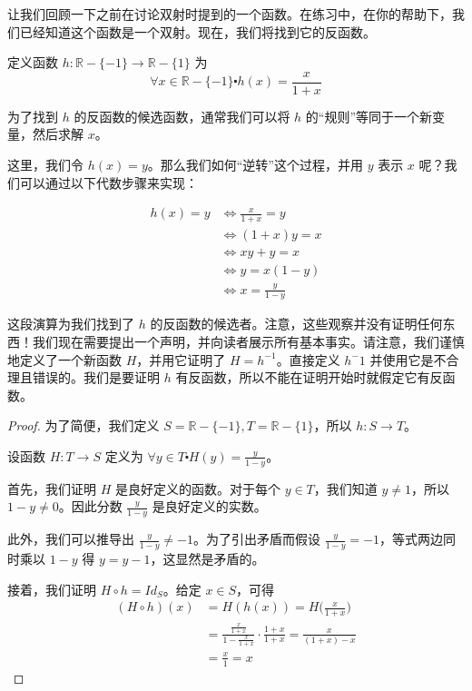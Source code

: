 让我们回顾一下之前在讨论双射时提到的一个函数。在练习中，在你的帮助下，我们已经知道这个函数是一个双射。现在，我们将找到它的反函数。\\

\begin{example}
    定义函数 $h : \mathbb{R} - \{-1\} \to \mathbb{R}- \{1\}$ 为
    \[\forall x \in \mathbb{R} - \{-1\} \centerdot h(x) = \frac{x}{1+x}\]

    为了找到 $h$ 的反函数的候选函数，通常我们可以将 $h$ 的``规则''等同于一个新变量，然后求解 $x$。

    这里，我们令 $h(x) = y$。那么我们如何``逆转''这个过程，并用 $y$ 表示 $x$ 呢？我们可以通过以下代数步骤来实现：

    \begin{align*}
        h(x) = y &\iff \frac{x}{1+x} = y \\
        &\iff (1 + x)y = x \\
        &\iff xy + y = x \\
        &\iff y = x(1 - y) \\
        &\iff x = \frac{y}{1-y}
    \end{align*}

    这段演算为我们找到了 $h$ 的反函数的候选者。注意，这些观察并没有证明任何东西！我们现在需要提出一个声明，并向读者展示所有基本事实。请注意，我们谨慎地定义了一个新函数 $H$，并用它证明了 $H = h^{-1}$。直接定义 $h^-1$ 并使用它是不合理且错误的。我们是要证明 $h$ 有反函数，所以不能在证明开始时就假定它有反函数。

    \begin{proof}
        为了简便，我们定义 $S = \mathbb{R} - \{-1\}, T = \mathbb{R}- \{1\}$，所以 $h:S \to T$。

        设函数 $H: T \to S$ 定义为 $\forall y \in T \centerdot H(y) = \frac{y}{1-y}$。

        首先，我们证明 $H$ 是良好定义的函数。对于每个 $y \in T$，我们知道 $y \ne 1$，所以 $1-y \ne 0$。因此分数 $\frac{y}{1-y}$ 是良好定义的实数。

        此外，我们可以推导出 $\frac{y}{1-y} \ne -1$。为了引出矛盾而假设 $\frac{y}{1-y} = -1$，等式两边同时乘以 $1-y$ 得 $y = y-1$，这显然是矛盾的。

        接着，我们证明 $H \circ h = Id_S$。给定 $x \in S$，可得
        \begin{align*}
            (H \circ h)(x) &= H(h(x)) = H\Big(\frac{x}{1+x}\Big) \\
            &=\frac{\frac{x}{1+x}}{1-\frac{x}{1+x}} \cdot \frac{1+x}{1+x} = \frac{x}{(1+x)-x} \\
            &=\frac{x}{1} = x
        \end{align*}


\end{proof}
\end{example}
